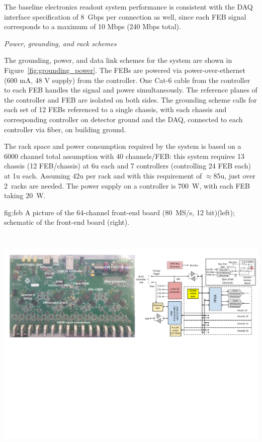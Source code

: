 The baseline electronics readout system performance is consistent with the DAQ interface specification of 8~Gbps per connection as well, since each FEB signal corresponds to a maximum of 10 Mbps (240 Mbps total).  

\textit{\it Power, grounding, and rack schemes} 

The grounding, power, and data link schemes for the system are shown in Figure~\ref{fig:grounding_power}. The FEBs are powered via power-over-ethernet (600 mA, 48 V supply) from the controller. One Cat-6 cable from the controller to each FEB handles the signal and power simultaneously. The reference planes of the controller and FEB are isolated on both sides. The grounding scheme calls for each set of 12 FEBs referenced to a single chassis, with each chassis and corresponding controller on detector ground and the DAQ, connected to each controller via fiber, on building ground. 
 
The rack space and power consumption required by the system is based on a 6000 channel total assumption with 40 channels/FEB: this system requires 13 chassis (12 FEB/chassis) at 6u each and 7 controllers (controlling 24 FEB each) at 1u each. Assuming 42u per rack and with this requirement of $\approx$85u, just over 2~racks are needed. The power supply on a controller is 700~W, with each FEB taking 20~W. 
 

\begin{dunefigure}
 {fig:feb}
 {A picture of the 64-channel  front-end board (80~MS/s, 12 bit)(left); schematic of the front-end board (right).}
\includegraphics[height=4.8in]{graphics/pds-feb-tdr.pdf} 
\vspace{-6.3cm}
\end{dunefigure}

